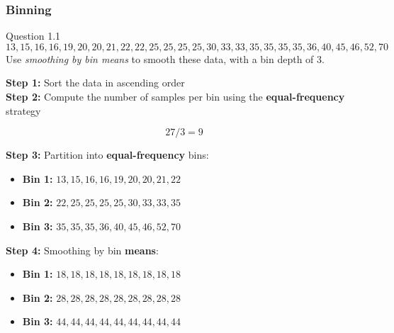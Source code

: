 \documentclass[aspectratio=169, 10pt]{beamer}
\begin{document}
\begin{frame}[t]
    \frametitle{Binning}
    \small

    \begin{block}{Question 1.1}
        \[13,15,16,16,19,20,20,21,22,22,25,25,25,25,30,33,33,35,35,35,35,36,40,45,46,52,70\]
        Use \textit{smoothing by bin means} to smooth these data, with a bin depth of 3.
    \end{block}
    \textbf{Step 1:} Sort the data in ascending order \\
    \textbf{Step 2:} Compute the number of samples per bin using the \textbf{equal-frequency} strategy 

    \[27/3=9\]

    \textbf{Step 3:} Partition into \textbf{equal-frequency} bins:

    \begin{itemize}
        \item \textbf{Bin 1:} $13,15,16,16,19,20,20,21,22$
        \item \textbf{Bin 2:} $22,25,25,25,25,30,33,33,35$
        \item \textbf{Bin 3:} $35,35,35,36,40,45,46,52,70$
    \end{itemize}

    \textbf{Step 4:} Smoothing by bin \textbf{means}:

    \begin{itemize}
        \item \textbf{Bin 1:} $18, 18, 18, 18, 18, 18, 18, 18, 18$
        \item \textbf{Bin 2:} $28, 28, 28, 28, 28, 28, 28, 28, 28$
        \item \textbf{Bin 3:} $44, 44, 44, 44, 44, 44, 44, 44, 44$
    \end{itemize}
\end{frame}
\end{document}
